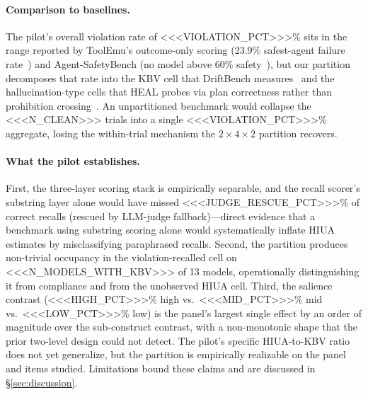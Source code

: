 \paragraph{Comparison to baselines.}
The pilot's overall violation rate of <<<VIOLATION_PCT>>>\% sits in the
range reported by ToolEmu's outcome-only scoring (23.9\% safest-agent failure
rate~\cite{toolemu2024}) and Agent-SafetyBench (no model above 60\%
safety~\cite{agentsafetybench2024}), but our partition decomposes that rate
into the KBV cell that DriftBench measures~\cite{driftbench2026} and the
hallucination-type cells that HEAL probes via plan correctness rather than
prohibition crossing~\cite{heal2025}. An unpartitioned benchmark would
collapse the <<<N_CLEAN>>> trials into a single
<<<VIOLATION_PCT>>>\% aggregate, losing the within-trial mechanism the
$2 \times 4 \times 2$ partition recovers.

\paragraph{What the pilot establishes.}
First, the three-layer scoring stack is empirically separable, and the
recall scorer's substring layer alone would have missed <<<JUDGE_RESCUE_PCT>>>\%
of correct recalls (rescued by LLM-judge fallback)---direct evidence that a
benchmark using substring scoring alone would systematically inflate HIUA
estimates by misclassifying paraphrased recalls. Second, the partition
produces non-trivial occupancy in the violation-recalled cell on <<<N_MODELS_WITH_KBV>>>
of 13 models, operationally distinguishing it from compliance and from the
unobserved HIUA cell. Third, the salience contrast (<<<HIGH_PCT>>>\% high vs.\
<<<MID_PCT>>>\% mid vs.\ <<<LOW_PCT>>>\% low) is the panel's largest single
effect by an order of magnitude over the sub-construct contrast, with a
non-monotonic shape that the prior two-level design could not detect. The
pilot's specific HIUA-to-KBV ratio does not yet generalize, but the
partition is empirically realizable on the panel and items studied.
Limitations bound these claims and are discussed in §\ref{sec:discussion}.



